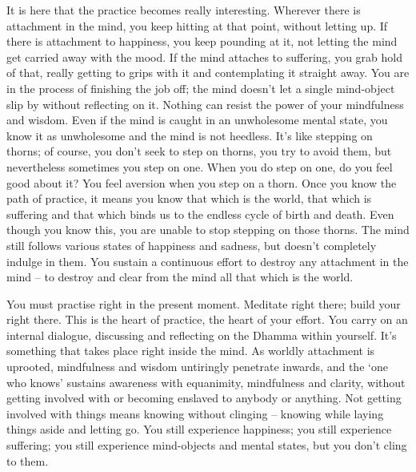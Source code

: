 It is here that the practice becomes really interesting. Wherever there is attachment in the mind, you keep hitting at that point, without letting up. If there is attachment to happiness, you keep pounding at it, not letting the mind get carried away with the mood. If the mind attaches to suffering, you grab hold of that, really getting to grips with it and contemplating it straight away. You are in the process of finishing the job off; the mind doesn't let a single mind-object slip by without reflecting on it. Nothing can resist the power of your mindfulness and wisdom. Even if the mind is caught in an unwholesome mental state, you know it as unwholesome and the mind is not heedless. It's like stepping on thorns; of course, you don't seek to step on thorns, you try to avoid them, but nevertheless sometimes you step on one. When you do step on one, do you feel good about it? You feel aversion when you step on a thorn. Once you know the path of practice, it means you know that which is the world, that which is suffering and that which binds us to the endless cycle of birth and death. Even though you know this, you are unable to stop stepping on those thorns. The mind still follows various states of happiness and sadness, but doesn't completely indulge in them. You sustain a continuous effort to destroy any attachment in the mind -- to destroy and clear from the mind all that which is the world.

You must practise right in the present moment. Meditate right there; build your  right there. This is the heart of practice, the heart of your effort. You carry on an internal dialogue, discussing and reflecting on the Dhamma within yourself. It's something that takes place right inside the mind. As worldly attachment is uprooted, mindfulness and wisdom untiringly penetrate inwards, and the `one who knows' sustains awareness with equanimity, mindfulness and clarity, without getting involved with or becoming enslaved to anybody or anything. Not getting involved with things means knowing without clinging -- knowing while laying things aside and letting go. You still experience happiness; you still experience suffering; you still experience mind-objects and mental states, but you don't cling to them.


